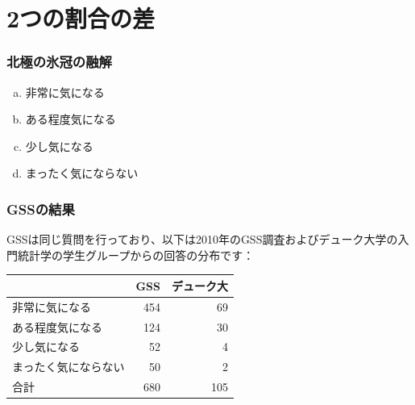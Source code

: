 
\section{2つの割合の差}


\begin{frame}
\frametitle{北極の氷冠の融解}


\begin{enumerate}[(a)]
\item 非常に気になる
\item ある程度気になる
\item 少し気になる
\item まったく気にならない
\end{enumerate}

\end{frame}


\begin{frame}
\frametitle{GSSの結果}

GSSは同じ質問を行っており、以下は2010年のGSS調査およびデューク大学の入門統計学の学生グループからの回答の分布です：\\

\begin{center}
\begin{tabular}{l r r}
\hline
				& GSS	& デューク大 \\
\hline
非常に気になる		& 454	& 69 \\
ある程度気になる		& 124 	& 30\\
少し気になる		& 52 		& 4\\
まったく気にならない	& 50 		& 2 \\
\hline
合計				& 680 	& 105\\
\hline
\end{tabular}
\end{center}

\end{frame}


